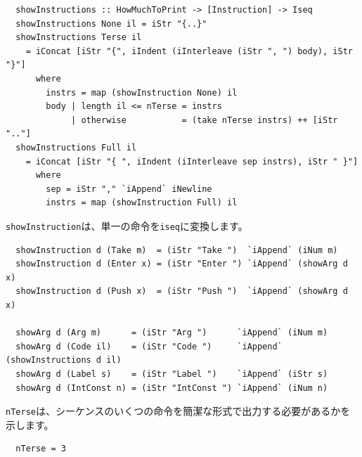 \documentclass{jbook}
\begin{document}
\begin{verbatim}
  showInstructions :: HowMuchToPrint -> [Instruction] -> Iseq
  showInstructions None il = iStr "{..}"
  showInstructions Terse il
    = iConcat [iStr "{", iIndent (iInterleave (iStr ", ") body), iStr "}"]
      where
        instrs = map (showInstruction None) il
        body | length il <= nTerse = instrs
             | otherwise           = (take nTerse instrs) ++ [iStr ".."]
  showInstructions Full il
    = iConcat [iStr "{ ", iIndent (iInterleave sep instrs), iStr " }"]
      where
        sep = iStr "," `iAppend` iNewline
        instrs = map (showInstruction Full) il
\end{verbatim}

\texttt{showInstruction}は、単一の命令を\texttt{iseq}に変換します。

\begin{verbatim}
  showInstruction d (Take m)  = (iStr "Take ")  `iAppend` (iNum m)
  showInstruction d (Enter x) = (iStr "Enter ") `iAppend` (showArg d x)
  showInstruction d (Push x)  = (iStr "Push ")  `iAppend` (showArg d x)

  showArg d (Arg m)      = (iStr "Arg ")      `iAppend` (iNum m)
  showArg d (Code il)    = (iStr "Code ")     `iAppend` (showInstructions d il)
  showArg d (Label s)    = (iStr "Label ")    `iAppend` (iStr s)
  showArg d (IntConst n) = (iStr "IntConst ") `iAppend` (iNum n)
\end{verbatim}

\texttt{nTerse}は、シーケンスのいくつの命令を簡潔な形式で出力する必要があるかを示します。

\begin{verbatim}
  nTerse = 3
\end{verbatim}
\end{document}

